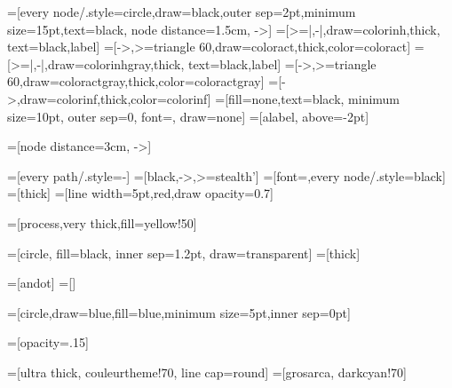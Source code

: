 =[every node/.style={circle,draw=black,outer sep=2pt,minimum
                size=15pt,text=black}, node distance=1.5cm, ->]
=[>=|,-|,draw=colorinh,thick, text=black,label]
=[->,>=triangle 60,draw=coloract,thick,color=coloract]
=[>=|,-|,draw=colorinhgray,thick, text=black,label]
=[->,>=triangle 60,draw=coloractgray,thick,color=coloractgray]
=[->,draw=colorinf,thick,color=colorinf]
=[fill=none,text=black, %
minimum size=10pt, outer sep=0, font=\scriptsize, draw=none]
=[alabel, above=-2pt]

=[node distance=3cm, ->]

=[every path/.style={-}]
=[black,->,>=stealth']
=[font=\scriptsize,every node/.style={black}]
=[thick]
=[line width=5pt,red,draw opacity=0.7]


=[process,very thick,fill=yellow!50]

=[circle, fill=black, inner sep=1.2pt, draw=transparent]
=[thick]

=[andot] %
=[] %

=[circle,draw=blue,fill=blue,minimum size=5pt,inner sep=0pt]

=[opacity=.15]

=[ultra thick, couleurtheme!70, line cap=round]
=[grosarca, darkcyan!70]
